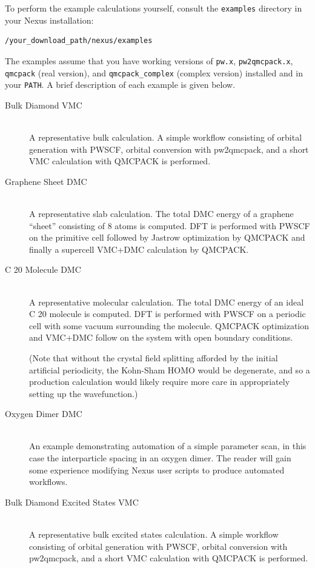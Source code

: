 \documentclass[oneside,11pt]{memoir}
\numberwithin{equation}{section}
\begin{document}
To perform the example calculations yourself, consult the \texttt{examples} 
directory in your Nexus installation:
\begin{shaded}
\begin{verbatim}
/your_download_path/nexus/examples
\end{verbatim}
\end{shaded}
\noindent
The examples assume that you have working versions of \texttt{pw.x}, 
\texttt{pw2qmcpack.x}, \texttt{qmcpack} (real version), and 
\texttt{qmcpack\_complex} (complex version) installed and in your \texttt{PATH}. 
A brief description of each example is given below.  


\begin{description}
  \item[Bulk Diamond VMC] \hfill \\
    A representative bulk calculation.  A simple workflow consisting 
    of orbital generation with PWSCF, orbital conversion with pw2qmcpack, 
    and a short VMC calculation with QMCPACK is performed.

  \item[Graphene Sheet DMC] \hfill \\
    A representative slab calculation.  The total DMC energy of a graphene 
    ``sheet'' consisting of 8 atoms is computed.  DFT is performed with 
    PWSCF on the primitive cell followed by Jastrow optimization by QMCPACK 
    and finally a supercell VMC+DMC calculation by QMCPACK.  

  \item[C 20 Molecule DMC] \hfill  \\
    A representative molecular calculation.  The total DMC energy of an ideal 
    C 20 molecule is computed.  DFT is performed with PWSCF on a periodic cell 
    with some vacuum surrounding the molecule.  QMCPACK optimization and 
    VMC+DMC follow on the system with open boundary conditions.  

    (Note that without the crystal field splitting afforded by the initial 
    artificial periodicity, the Kohn-Sham HOMO would be degenerate, and so a 
    production calculation would likely require more care in appropriately 
    setting up the wavefunction.)

  \item[Oxygen Dimer DMC] \hfill \\
    An example demonstrating automation of a simple parameter scan, in this 
    case the interparticle spacing in an oxygen dimer.  The reader will gain 
    some experience modifying Nexus user scripts to produce automated workflows.
    
  \item[Bulk Diamond Excited States VMC] \hfill \\
    A representative bulk excited states calculation.  A simple workflow consisting 
    of orbital generation with PWSCF, orbital conversion with pw2qmcpack, 
    and a short VMC calculation with QMCPACK is performed.
\end{description}
\end{document}

